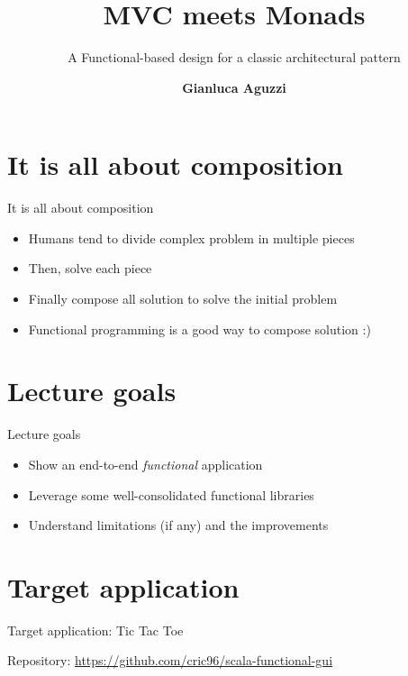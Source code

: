 \documentclass[presentation]{beamer}
\title[MVC Meets Monad]{MVC meets Monads}
\subtitle{A Functional-based design for a classic architectural pattern}
\author[G.Aguzzi]
{\textbf{Gianluca Aguzzi}}
\institute[shortinst]{\normalsize 
\textsc{Alma Mater Studiorum}--Universit\`a di Bologna, Cesena, Italy 
}
\let\oldcite\cite
\renewcommand{\cite}[1]{{\color{blue}\oldcite{#1}}}
\begin{document}

\section{It is all about composition}
\begin{frame}[fragile]{It is all about composition \cite{milewski2019category}}
\begin{itemize}
\item Humans tend to divide complex problem in multiple pieces
\item Then, solve each piece
\item Finally compose all solution to solve the initial problem
\item Functional programming is a good way to compose solution :)
\end{itemize}


\section{Lecture goals}
\end{frame}
\begin{frame}[fragile]{Lecture goals}
\begin{itemize}
\item Show an end-to-end \emph{functional} application
\item Leverage some well-consolidated functional libraries
\item Understand limitations (if any) and the improvements
\end{itemize}
\end{frame}

\section{Target application}
\begin{frame}[fragile]{Target application: Tic Tac Toe}
\begin{center}
  Repository: \url{https://github.com/cric96/scala-functional-gui}
\end{center}
\end{frame}
\end{document}
